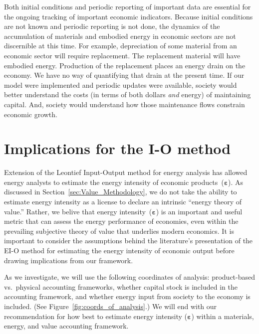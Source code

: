 Both initial conditions and periodic reporting of important data 
are essential for the ongoing tracking of important economic indicators.  
Because initial conditions are not known and periodic reporting is not done, 
the dynamics of the accumulation of materials and embodied energy 
in economic sectors are not discernible at this time.  
For example, depreciation of some material from an economic sector will require replacement.  
The replacement material will have embodied energy.  
Production of the replacement places an energy drain on the economy.  
We have no way of quantifying that drain at the present time.  
If our model were implemented and periodic updates were available, 
society would better understand the costs (in terms of both dollars \emph{and} energy) 
of maintaining capital.  
And, society would understand how those maintenance flows constrain economic growth.


\section{Implications for the I-O method}
\label{sec:Implications_for_IO}

Extension of the Leontief
Input-Output method
for energy analysis has allowed energy analysts to estimate 
the energy intensity
of economic products~($\boldsymbol{\varepsilon}$). 
As discussed in Section~\ref{sec:Value_Methodology},
we do not take the ability to estimate energy intensity as a license
to declare an intrinsic ``energy theory of value.''
Rather, we belive that energy intensity~($\boldsymbol{\varepsilon}$) is an 
important and useful metric that can assess 
the energy performance of economies,
even within the prevailing subjective theory of value
that underlies modern economics.
It is important to consider the assumptions behind
the literature's presentation of the EI-O method 
for estimating the energy intensity of economic output
before drawing implications from our framework.

As we investigate, we will use the following
coordinates of analysis:
product-based vs.\ physical accounting frameworks,
whether capital stock is included in the accounting framework, and
whether energy input from society to the economy is included.
(See Figure~\ref{fig:coords_of_analysis}.)
We will end with our recommendation for how best to estimate energy intensity
($\boldsymbol{\varepsilon}$) within
a materials, energy, and value accounting framework.

